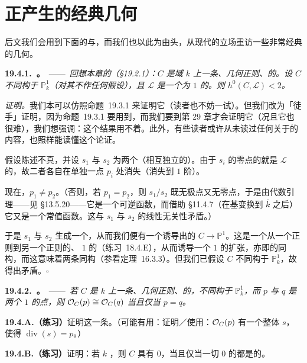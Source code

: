 
\section{正\trGenus{}\trCurve{}产生的经典几何}

后文我们会用到下面的\trhProposition{}与\trhCorollary，而我们也以此为由头，从现代的立场重访一些非常经典的几何。

\textbf{19.4.1.\ \trhProposition。}\ ——\ \emph{回想本章的\trStandingHypothesis（\S19.2.1）：$C$ 是域 $k$ 上一条\trProjective、几何正则、\trGeometricallyIntegral{}的\trCurve。设 $C$ 不同构于 $\mathbb{P}^1_k$（对其\trGenus{}不作任何假设），且 $\mathscr{L}$ 是一个\trDegree{}为 $1$ 的\trInvertibleSheaf。则 $h^0(C,\mathscr{L})<2$。}

\emph{证明。}\quad 我们本可以仿照\mbox{命题~19.3.1} 来证明它（读者也不妨一试）。但我们改为「徒手」证明，因为\mbox{命题~19.3.1} 要用到\trSerreDuality，而我们要到第 29 章才会证明它（况且它也很难），我们想强调：这个结果用不着\trSerreDuality。此外，有些读者或许从未读过任何关于\trSerreDuality{}的内容，也照样能读懂这个论证。

假设陈述不真，并设 $s_1$ 与 $s_2$ 为两个（相互独立的）\trSection。由于 $s_i$ 的零点\trDivisor{}的\trDegree{}就是 $\mathscr{L}$ 的\trDegree，故二者各自在单独一点 $p_i$ 处消失（消失到 $1$ 阶）。

现在，$p_1\ne p_2$。（否则，若 $p_1=p_2$，则 $s_1/s_2$ 既无极点又无零点，于是由代数\trHartogs{}引理——见 \S13.5.20——它是一个可逆函数，而借助 \S11.4.7（在基变换到 $\bar{k}$ 之后）它又是一个常值函数。这与 $s_1$ 与 $s_2$ 的线性无关性矛盾。）

于是 $s_1$ 与 $s_2$ 生成一个\trBasePointFree\trLinearSystem，从而我们便有一个诱导出的\trMorphism{} $C\to\mathbb{P}^1$。这是一个从一个正则\trCurve{}到另一个正则\trCurve{}的\trFinite、\trDegree{} $1$ 的\trMorphism（\mbox{练习~18.4.E}），从而诱导一个\trDegree{} $1$ 的\trFunctionField{}扩张，亦即\trFunctionField{}的同构，而这意味着两条\trCurve{}同构（参看\mbox{定理~16.3.3}）。但我们已假设 $C$ 不同构于 $\mathbb{P}^1_k$，故得出矛盾。\hfill$\square$

\textbf{19.4.2.\ \trhCorollary。}\ ——\ \emph{若 $C$ 是 $k$ 上一条\trProjective、几何正则、\trGeometricallyIntegral{}的\trCurve，不同构于 $\mathbb{P}^1_k$，而 $p$ 与 $q$ 是两个\trDegree{} $1$ 的点，则 $\mathcal{O}_C(p)\cong\mathcal{O}_C(q)$ 当且仅当 $p=q$。}

\textbf{19.4.A.（练习）}\quad 证明这一条。（可能有用：证明／使用：$\mathcal{O}_C(p)$ 有一个整体\trSection{} $s$，使得 $\operatorname{div}(s)=p$。）

\textbf{19.4.B.（练习）}\quad 证明：若 $k$ \trAlgClosed，则 $C$ 具有\trGenus{} $0$，当且仅当一切\trDegree{} $0$ 的\trLineBundle{}都是\trTrivial{}的。

